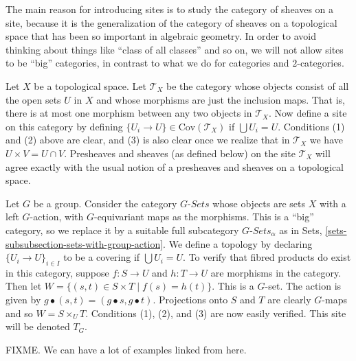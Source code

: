 \begin{remark}
\label{remark-no-big-sites}
The main reason for introducing sites is to study the
category of sheaves on a site, because it is the generalization
of the category of sheaves on a topological space that has
been so important in algebraic geometry. In order to avoid thinking
about things like ``class of all classes'' and so on, we will
not allow sites to be ``big'' categories, in contrast to what
we do for categories and $2$-categories.
\end{remark}

\begin{example}
\label{example-site-toplogical}
Let $X$ be a topological space. Let $\mathcal{T}_X$ be the category whose
objects consist of all the open sets $U$ in $X$ and whose morphisms
are just the inclusion maps. That is, there is at most one morphism
between any two objects in $\mathcal{T}_X$.  Now define a site on this
category by defining $\{U_i \to U\}\in \text{Cov}(\mathcal{T}_X)$ if
$\bigcup U_i = U$. Conditions (1) and (2) above are clear, and (3) is also
clear once we realize that in $\mathcal{T}_X$ we have
$U \times V = U \cap V$. Presheaves and sheaves (as defined below)
on the site $\mathcal{T}_X$ will agree exactly with the usual notion of
a presheaves and sheaves on a topological space.
\end{example}

\begin{example}
\label{example-site-on-group}
Let $G$ be a group. Consider the category $G\textit{-Sets}$
whose objects are sets $X$ with a left $G$-action, with
$G$-equivariant maps as the morphisms. This is a ``big'' category,
so we replace it by a suitable full subcategory $G\textit{-Sets}_\alpha$
as in Sets, \autoref{sets-subsubsection-sets-with-group-action}.
We define a topology by declaring $\{U_i \to U\}_{i\in I}$ to be 
a covering if $\bigcup U_i = U$. To verify that fibred products do 
exist in this category, suppose $f: S \rightarrow U$ and 
$h: T \rightarrow U$ are morphisms in the category. Then let 
$W = \{(s, t) \in S \times T \mid f(s) = h(t)\}$. This is a $G$-set. 
The action is given by $g \bullet(s,t) = (g \bullet s, g \bullet t)$.
Projections onto $S$ and $T$ are clearly $G$-maps and so 
$W = S \times_U T$.  Conditions (1), (2), and (3) are now easily 
verified. This site will be denoted $T_G$.
\end{example}

\begin{example}
FIXME. We can have a lot of examples linked from here.
\end{example}


